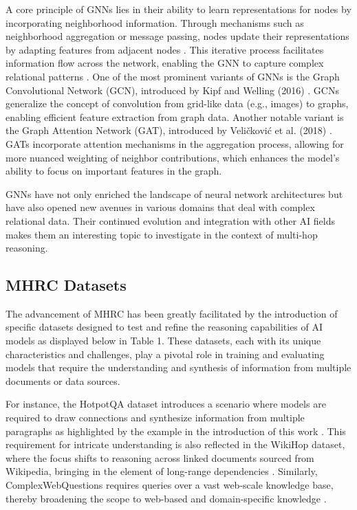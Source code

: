 \documentclass[sigplan,screen,nonacm]{acmart}
\begin{document}
A core principle of GNNs lies in their ability to learn representations for nodes by incorporating neighborhood information. Through mechanisms 
such as neighborhood aggregation or message passing, nodes update their representations by adapting features from adjacent nodes \cite{RN207}. 
This iterative process facilitates information flow across the network, enabling the GNN to capture complex relational patterns \cite{RN15}. 
One of the most prominent variants of GNNs is the Graph Convolutional Network (GCN), introduced by Kipf and Welling (2016) \cite{RN2}. GCNs generalize 
the concept of convolution from grid-like data (e.g., images) to graphs, enabling efficient feature extraction from graph data. 
Another notable variant is the Graph Attention Network (GAT), introduced by Veličković et al. (2018) \cite{RN7}. GATs incorporate attention mechanisms 
in the aggregation process, allowing for more nuanced weighting of neighbor contributions, which enhances the model's ability to focus on 
important features in the graph.

GNNs have not only enriched the landscape of neural network architectures but have also opened new avenues in various domains that deal with 
complex relational data. Their continued evolution and integration with other AI fields makes them an interesting topic to investigate in 
the context of multi-hop reasoning.


\subsection{MHRC Datasets}
The advancement of MHRC has been greatly facilitated by the introduction of specific datasets designed to test and refine the reasoning 
capabilities of AI models as displayed below in Table 1. These datasets, each with its unique characteristics and challenges, play a pivotal 
role in training and evaluating models that require the understanding and synthesis of information from multiple documents or data sources. 

For instance, the HotpotQA dataset introduces a scenario where models are required to draw connections and synthesize information from multiple paragraphs as highlighted by the example in the introduction of this work \cite{RN116}. 
This requirement for intricate understanding is also reflected in the WikiHop dataset, where the focus shifts to reasoning across linked documents sourced from Wikipedia, bringing in the element of long-range dependencies \cite{RN115}. 
Similarly, ComplexWebQuestions requires queries over a vast web-scale knowledge base, thereby broadening the scope to web-based and domain-specific knowledge \cite{RN104}.
\end{document}
